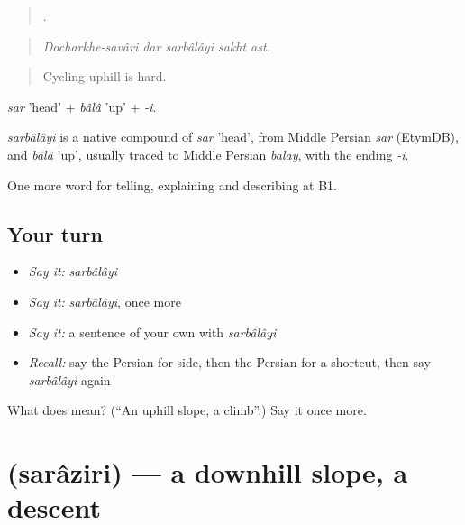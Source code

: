 \begin{quote}
     .
\end{quote}

\begin{quote}
\emph{Docharkhe-savâri dar sarbâlâyi sakht ast.}
\end{quote}

\begin{quote}
Cycling uphill is hard.
\end{quote}

\emph{sar} 'head' + \emph{bâlâ} 'up' + \emph{-i}.

\begin{cousinweb}
\emph{sarbâlâyi} is a native compound of \emph{sar} 'head', from Middle Persian \emph{sar} (EtymDB), and \emph{bâlâ} 'up', usually traced to Middle Persian \emph{bālāy}, with the ending \emph{-i}.
\end{cousinweb}

\begin{grammarlens}[title={What you've built}]
One more word for telling, explaining and describing at B1.
\end{grammarlens}

\subsection*{Your turn}
\begin{itemize}
\raggedright
  \item \emph{Say it:} \emph{sarbâlâyi}
  \item \emph{Say it:} \emph{sarbâlâyi}, once more
  \item \emph{Say it:} a sentence of your own with \emph{sarbâlâyi}
  \item \emph{Recall:} say the Persian for side, then the Persian for a shortcut, then say \emph{sarbâlâyi} again
\end{itemize}

\begin{tcolorbox}[breakable,colback=teal!4,colframe=teal!35!black,title={Before you move on}]
What does  mean? (\textquotedblleft{}An uphill slope, a climb\textquotedblright{}.) Say it once more.
\end{tcolorbox}
\section[\texorpdfstring{\fa{سرازیری} (sarâziri)}{سرازیری (sarâziri)}]{ (sarâziri) — a downhill slope, a descent}

